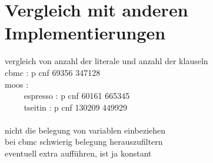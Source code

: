 \section{Vergleich mit anderen Implementierungen}


vergleich von anzahl der literale und anzahl der klauseln\\
cbmc   :   p cnf 69356 347128\\
moos :\\
~~~~ espresso : p cnf 60161 665345\\
~~~~ tseitin : p cnf 130209 449929\\
~\\
nicht die belegung von variablen einbeziehen\\
bei cbmc schwierig belegung herauszufiltern\\
eventuell extra aufführen, ist ja konstant